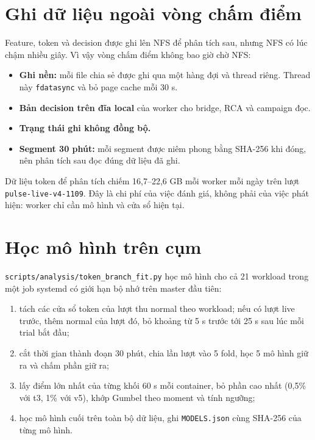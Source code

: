 \section{Ghi dữ liệu ngoài vòng chấm điểm}

Feature, token và decision được ghi lên NFS để phân tích sau, nhưng NFS có lúc chậm nhiều giây. Vì vậy vòng chấm điểm không bao giờ chờ NFS:

\begin{itemize}
\tightlist
\item
  \textbf{Ghi nền:} mỗi file chia sẻ được ghi qua một hàng đợi và thread riêng. Thread này \texttt{fdatasync} và bỏ page cache mỗi 30 s.
\item
  \textbf{Bản decision trên đĩa local} của worker cho bridge, RCA và campaign đọc.
\item
  \textbf{Trạng thái ghi không đồng bộ.}
\item
  \textbf{Segment 30 phút:} mỗi segment được niêm phong bằng SHA-256 khi đóng, nên phân tích sau đọc đúng dữ liệu đã ghi.
\end{itemize}

Dữ liệu token để phân tích chiếm 16,7--22,6 GB mỗi worker mỗi ngày trên lượt \texttt{pulse-\allowbreak{}live-\allowbreak{}v4-\allowbreak{}1109}. Đây là chi phí của việc đánh giá, không phải của việc phát hiện: worker chỉ cần mô hình và cửa sổ hiện tại.

\section{Học mô hình trên cụm}

\texttt{scripts/\allowbreak{}analysis/\allowbreak{}token\_\allowbreak{}branch\_\allowbreak{}fit.py} học mô hình cho cả 21 workload trong một job systemd có giới hạn bộ nhớ trên master đầu tiên:

\begin{enumerate}
\def\labelenumi{\arabic{enumi}.}
\tightlist
\item
  tách các cửa sổ token của lượt thu normal theo workload; nếu có lượt live trước, thêm normal của lượt đó, bỏ khoảng từ 5 s trước tới 25 s sau lúc mỗi trial bắt đầu;
\item
  cắt thời gian thành đoạn 30 phút, chia lần lượt vào 5 fold, học 5 mô hình giữ ra và chấm phần giữ ra;
\item
  lấy điểm lớn nhất của từng khối 60 s mỗi container, bỏ phần cao nhất (0,5\% với t3, 1\% với v5), khớp Gumbel theo moment và tính ngưỡng;
\item
  học mô hình cuối trên toàn bộ dữ liệu, ghi \texttt{MODELS.json} cùng SHA-256 của từng mô hình.
\end{enumerate}


